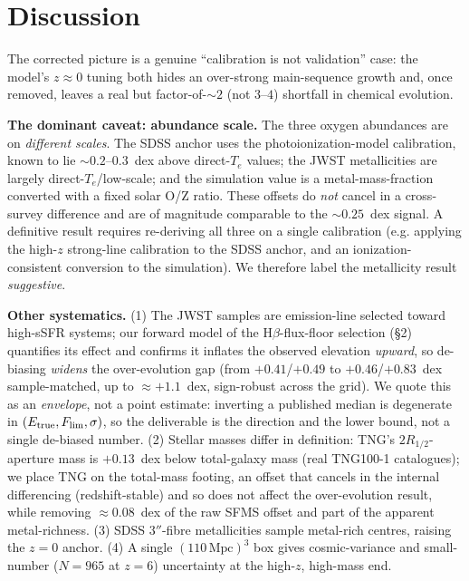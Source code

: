 \documentclass[twocolumn]{aastex631}
\begin{document}
\section{Discussion}
The corrected picture is a genuine ``calibration is not validation'' case: the model's $z\approx0$ tuning both hides an over-strong main-sequence growth and, once removed, leaves a real but factor-of-$\sim2$ (not $3$--$4$) shortfall in chemical evolution.

\textbf{The dominant caveat: abundance scale.} The three oxygen abundances are on \emph{different scales}. The SDSS anchor uses the \citet{tremonti04} photoionization-model calibration, known to lie $\sim0.2$--$0.3$~dex above direct-$T_e$ values; the JWST metallicities are largely direct-$T_e$/low-scale; and the simulation value is a metal-mass-fraction converted with a fixed solar O/Z ratio. These offsets do \emph{not} cancel in a cross-survey difference and are of magnitude comparable to the $\sim0.25$~dex signal. A definitive result requires re-deriving all three on a single calibration (e.g. applying the high-$z$ strong-line calibration to the SDSS anchor, and an ionization-consistent conversion to the simulation). We therefore label the metallicity result \emph{suggestive}.

\textbf{Other systematics.} (1) The JWST samples are emission-line selected toward high-sSFR systems; our forward model of the $\mathrm{H}\beta$-flux-floor selection (\S2) quantifies its effect and confirms it inflates the observed elevation \emph{upward}, so de-biasing \emph{widens} the over-evolution gap (from $+0.41$/$+0.49$ to $+0.46$/$+0.83$~dex sample-matched, up to $\approx+1.1$~dex, sign-robust across the grid). We quote this as an \emph{envelope}, not a point estimate: inverting a published median is degenerate in $(E_{\rm true},F_{\rm lim},\sigma)$, so the deliverable is the direction and the lower bound, not a single de-biased number. (2) Stellar masses differ in definition: TNG's $2R_{1/2}$-aperture mass is $+0.13$~dex below total-galaxy mass (real TNG100-1 catalogues); we place TNG on the total-mass footing, an offset that cancels in the internal differencing (redshift-stable) and so does not affect the over-evolution result, while removing $\approx0.08$~dex of the raw SFMS offset and part of the apparent metal-richness. (3) SDSS $3''$-fibre metallicities sample metal-rich centres, raising the $z=0$ anchor. (4) A single $(110\,\mathrm{Mpc})^3$ box gives cosmic-variance and small-number ($N=965$ at $z=6$) uncertainty at the high-$z$, high-mass end.
\end{document}
